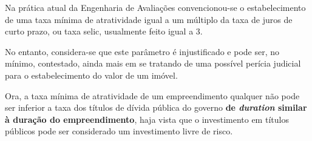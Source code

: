 \documentclass[
	12pt,				%
	oneside,			%
	a4paper,			%
	chapter=TITLE,		%
	section=TITLE,		%
	english,			%
	brazil				%
	]{abntex2}
\begin{document}
Na prática atual da Engenharia de Avaliações convencionou-se o estabelecimento
de uma taxa mínima de atratividade igual a um múltiplo da taxa de juros de curto
prazo, ou taxa selic, usualmente feito igual a 3.

No entanto, considera-se que este parâmetro é injustificado e pode ser, no
mínimo, contestado, ainda mais em se tratando de uma possível perícia judicial
para o estabelecimento do valor de um imóvel.

Ora, a taxa mínima de atratividade de um empreendimento qualquer não pode ser
inferior a taxa dos títulos de dívida pública do governo \textbf{de \emph{duration} similar
à duração do empreendimento}, haja vista que o investimento em títulos públicos
pode ser considerado um investimento livre de risco.
\begin{table}


\end{table}
\end{document}
